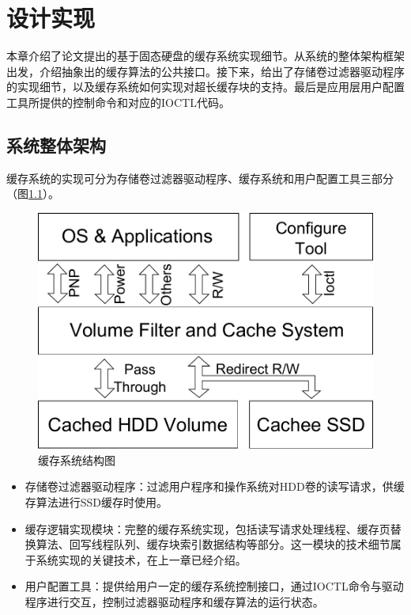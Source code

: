 
\chapter{设计实现}
\label{cha:mainmatter}

本章介绍了论文提出的基于固态硬盘的缓存系统实现细节。从系统的整体架构框架出发，介绍抽象出的缓存算法的公共接口。接下来，给出了存储卷过滤器驱动程序的实现细节，以及缓存系统如何实现对超长缓存块的支持。最后是应用层用户配置工具所提供的控制命令和对应的IOCTL代码。

\section{系统整体架构}
\label{sec:system_overview}

缓存系统的实现可分为存储卷过滤器驱动程序、缓存系统和用户配置工具三部分（图\ref{fig:sys-overview}）。

\begin{figure}[!ht]
\centering
\includegraphics[width=0.6\linewidth]{./graph/sys-overview}
\caption{缓存系统结构图}
\label{fig:sys-overview}
\end{figure}

\begin{itemize}
\item
存储卷过滤器驱动程序：过滤用户程序和操作系统对HDD卷的读写请求，供缓存算法进行SSD缓存时使用。
\item
缓存逻辑实现模块：完整的缓存系统实现，包括读写请求处理线程、缓存页替换算法、回写线程队列、缓存块索引数据结构等部分。这一模块的技术细节属于系统实现的关键技术，在上一章已经介绍。
\item
用户配置工具：提供给用户一定的缓存系统控制接口，通过IOCTL命令与驱动程序进行交互，控制过滤器驱动程序和缓存算法的运行状态。
\end{itemize}

